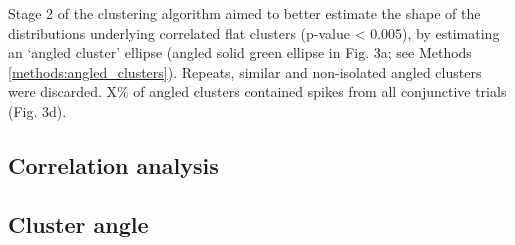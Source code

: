 \documentclass{article}
\begin{document}
Stage 2 of the clustering algorithm aimed to better estimate the shape of the distributions underlying correlated flat clusters (p-value < 0.005), by estimating an `angled cluster' ellipse (angled solid green ellipse in Fig. 3a; see Methods \ref{methods:angled_clusters}). Repeats, similar and non-isolated angled clusters were discarded. 
 
X\% of angled clusters contained spikes from all conjunctive trials (Fig. 3d).


\subsection*{Correlation analysis}



\subsection*{Cluster angle}
\label{results:cluster_angle}
\end{document}
